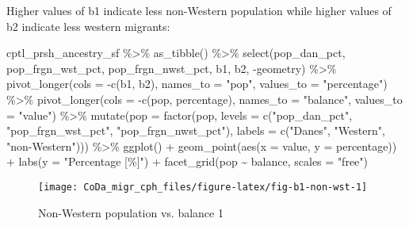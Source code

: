 \documentclass[
  12pt,
]{article}
\newenvironment{Shaded}{\begin{snugshade}}{\end{snugshade}}
\newcommand{\AttributeTok}[1]{\textcolor[rgb]{0.77,0.63,0.00}{#1}}
\newcommand{\FunctionTok}[1]{\textcolor[rgb]{0.00,0.00,0.00}{#1}}
\newcommand{\NormalTok}[1]{#1}
\newcommand{\SpecialCharTok}[1]{\textcolor[rgb]{0.00,0.00,0.00}{#1}}
\newcommand{\StringTok}[1]{\textcolor[rgb]{0.31,0.60,0.02}{#1}}
\begin{document}
Higher values of b1 indicate less non-Western population while higher
values of b2 indicate less western migrants:

\begin{Shaded}
\begin{Highlighting}[]
\NormalTok{cptl\_prsh\_ancestry\_sf }\SpecialCharTok{\%\textgreater{}\%} 
  \FunctionTok{as\_tibble}\NormalTok{() }\SpecialCharTok{\%\textgreater{}\%} 
  \FunctionTok{select}\NormalTok{(pop\_dan\_pct, pop\_frgn\_wst\_pct, pop\_frgn\_nwst\_pct, b1, b2, }\SpecialCharTok{{-}}\NormalTok{geometry) }\SpecialCharTok{\%\textgreater{}\%} 
  \FunctionTok{pivot\_longer}\NormalTok{(}\AttributeTok{cols =} \SpecialCharTok{{-}}\FunctionTok{c}\NormalTok{(b1, b2),}
               \AttributeTok{names\_to =} \StringTok{"pop"}\NormalTok{,}
               \AttributeTok{values\_to =} \StringTok{"percentage"}\NormalTok{) }\SpecialCharTok{\%\textgreater{}\%}
  \FunctionTok{pivot\_longer}\NormalTok{(}\AttributeTok{cols =} \SpecialCharTok{{-}}\FunctionTok{c}\NormalTok{(pop, percentage),}
               \AttributeTok{names\_to =} \StringTok{"balance"}\NormalTok{,}
               \AttributeTok{values\_to =} \StringTok{"value"}\NormalTok{) }\SpecialCharTok{\%\textgreater{}\%} 
  \FunctionTok{mutate}\NormalTok{(}\AttributeTok{pop =} \FunctionTok{factor}\NormalTok{(pop,}
                      \AttributeTok{levels =} \FunctionTok{c}\NormalTok{(}\StringTok{"pop\_dan\_pct"}\NormalTok{,}
                                 \StringTok{"pop\_frgn\_wst\_pct"}\NormalTok{,}
                                 \StringTok{"pop\_frgn\_nwst\_pct"}\NormalTok{),}
                      \AttributeTok{labels =} \FunctionTok{c}\NormalTok{(}\StringTok{"Danes"}\NormalTok{,}
                                 \StringTok{"Western"}\NormalTok{,}
                                 \StringTok{"non{-}Western"}\NormalTok{))) }\SpecialCharTok{\%\textgreater{}\%}
  \FunctionTok{ggplot}\NormalTok{() }\SpecialCharTok{+}
  \FunctionTok{geom\_point}\NormalTok{(}\FunctionTok{aes}\NormalTok{(}\AttributeTok{x =}\NormalTok{ value,}
                 \AttributeTok{y =}\NormalTok{ percentage)) }\SpecialCharTok{+}
  \FunctionTok{labs}\NormalTok{(}\AttributeTok{y =} \StringTok{"Percentage [\%]"}\NormalTok{) }\SpecialCharTok{+}
  \FunctionTok{facet\_grid}\NormalTok{(pop }\SpecialCharTok{\textasciitilde{}}\NormalTok{ balance, }\AttributeTok{scales =} \StringTok{"free"}\NormalTok{)}
\end{Highlighting}
\end{Shaded}

\begin{figure}[H]

{\centering \texttt{[image: CoDa\_migr\_cph\_files/figure-latex/fig-b1-non-wst-1]} 

}

\caption{Non-Western population vs. balance 1}\label{fig:fig-b1-non-wst}
\end{figure}
\end{document}
